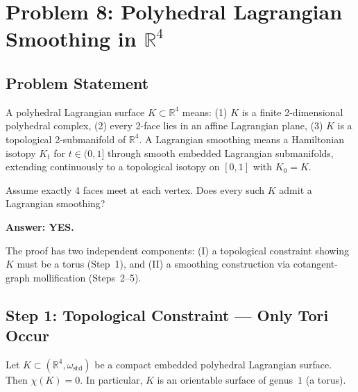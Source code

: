 \section{Problem 8: Polyhedral Lagrangian Smoothing in $\mathbb R^4$}\label{sec:q8}

\subsection*{Problem Statement}
A polyhedral Lagrangian surface $K\subset\mathbb R^4$ means:
(1) $K$ is a finite 2-dimensional polyhedral complex,
(2) every 2-face lies in an affine Lagrangian plane,
(3) $K$ is a topological 2-submanifold of $\mathbb R^4$.
A Lagrangian smoothing means a Hamiltonian isotopy $K_t$ for $t\in(0,1]$ through smooth embedded Lagrangian submanifolds, extending continuously to a topological isotopy on $[0,1]$ with $K_0=K$.

Assume exactly 4 faces meet at each vertex. Does every such $K$ admit a Lagrangian smoothing?

\medskip
\noindent\textbf{Answer: YES.}

The proof has two independent components:
(I) a topological constraint showing $K$ must be a torus (Step~1), and
(II) a smoothing construction via cotangent-graph mollification (Steps~2--5).

\subsection*{Step 1: Topological Constraint --- Only Tori Occur}

\begin{proposition}\label{prop:q8-euler}
Let $K\subset(\mathbb R^4,\omega_{\mathrm{std}})$ be a compact embedded polyhedral Lagrangian surface.
Then $\chi(K)=0$.  In particular, $K$ is an orientable surface of genus~$1$ (a torus).
\end{proposition}

